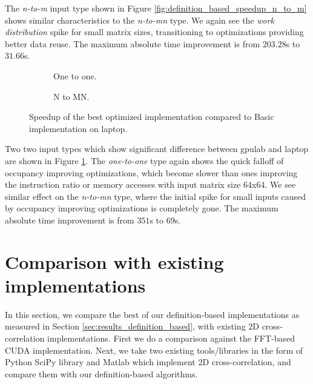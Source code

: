 The \textit{n-to-m} input type shown in Figure \ref{fig:definition_based_speedup_n_to_m} shows similar characteristics to the \textit{n-to-mn} type. We again see the \textit{work distribution} spike for small matrix sizes, transitioning to optimizations providing better data reuse. The maximum absolute time improvement is from $203.28$s to $31.66$s.

\begin{figure}[ht]
	\centering	
	\begin{subfigure}{0.4\textwidth}
		\centering
		\def\svgwidth{\textwidth}
		
		\caption{One to one.}
	\end{subfigure}
	\begin{subfigure}{0.4\textwidth}
		\centering
		\def\svgwidth{\textwidth}
		
		\caption{N to MN.}
	\end{subfigure}
	\caption{Speedup of the best optimized implementation compared to Basic implementation on laptop.}
	\label{fig:definition_based_speedup_laptop}
\end{figure}

Two two input types which show significant difference between gpulab and laptop are shown in Figure \ref{fig:definition_based_speedup_laptop}. The \textit{one-to-one} type again shows the quick falloff of occupancy improving optimizations, which become slower than ones improving the instruction ratio or memory accesses with input matrix size 64x64. We see similar effect on the \textit{n-to-mn} type, where the initial spike for small inputs caused by occupancy improving optimizations is completely gone. The maximum absolute time improvement is from $351$s to $69$s.

\section{Comparison with existing implementations}

In this section, we compare the best of our definition-based implementations as measured in Section \ref{sec:results_definition_based}, with existing 2D cross-correlation implementations. First we do a comparison against the FFT-based CUDA implementation. Next, we take two existing tools/libraries in the form of Python SciPy \citet{journal:scipy} library and Matlab \citep{site:matlab} which implement 2D cross-correlation, and compare them with our definition-based algorithms.

